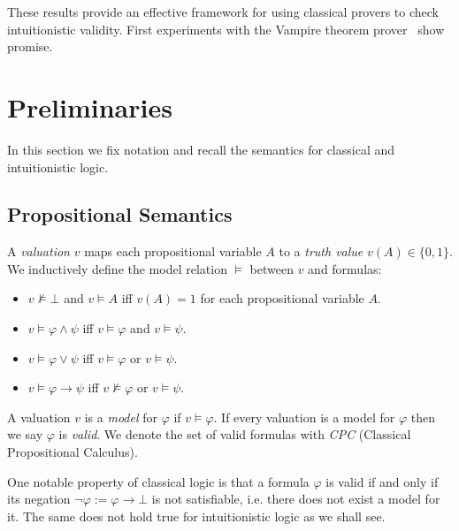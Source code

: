 \documentclass[runningheads]{llncs}
\begin{document}
These results provide an effective framework for using classical provers to check intuitionistic validity. First experiments with the Vampire theorem prover~\cite{kovacs2013first} show promise.


\section{Preliminaries}

In this section we fix notation and recall the semantics for classical and intuitionistic logic.

\subsection{Propositional Semantics}

\begin{definition}
A \emph{valuation} $v$ maps each propositional variable $A$ to a \emph{truth value} $v(A)\in\{0, 1\}$. We inductively define the model relation $\models$ between $v$ and formulas:
	\begin{itemize}
		\item $v\not\models \bot$ and $v\models A$ iff $v(A) = 1$ for each propositional variable $A$.
		\item $v\models \varphi\wedge\psi$ iff $v\models\varphi$ and $v\models\psi$.
		\item $v\models\varphi\vee\psi$ iff $v\models\varphi$ or $v\models\psi$.
		\item $v\models\varphi\to \psi$ iff $v\not\models\varphi$ or $v\models\psi$.
	\end{itemize}
A valuation $v$ is a \emph{model} for $\varphi$ if $v\models\varphi$. If every valuation is a model for $\varphi$ then we say $\varphi$ is \emph{valid}. We denote the set of valid formulas with \emph{CPC} (Classical Propositional Calculus).
\end{definition}

One notable property of classical logic is that a formula $\varphi$ is valid if and only if its negation $\neg\varphi := \varphi\to\bot$ is not satisfiable, i.e. there does not exist a model for it. The same does not hold true for intuitionistic logic as we shall see.
\end{document}
